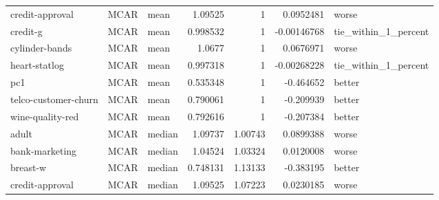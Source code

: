 \begin{table}[ht]
\begin{tabular}{lllrrrl}
 credit-approval      & MCAR        & mean             &                                 1.09525  &                             1        &                     0.0952481  & worse                \\
 credit-g             & MCAR        & mean             &                                 0.998532 &                             1        &                    -0.00146768 & tie\_within\_1\_percent \\
 cylinder-bands       & MCAR        & mean             &                                 1.0677   &                             1        &                     0.0676971  & worse                \\
 heart-statlog        & MCAR        & mean             &                                 0.997318 &                             1        &                    -0.00268228 & tie\_within\_1\_percent \\
 pc1                  & MCAR        & mean             &                                 0.535348 &                             1        &                    -0.464652   & better               \\
 telco-customer-churn & MCAR        & mean             &                                 0.790061 &                             1        &                    -0.209939   & better               \\
 wine-quality-red     & MCAR        & mean             &                                 0.792616 &                             1        &                    -0.207384   & better               \\
 adult                & MCAR        & median           &                                 1.09737  &                             1.00743  &                     0.0899388  & worse                \\
 bank-marketing       & MCAR        & median           &                                 1.04524  &                             1.03324  &                     0.0120008  & worse                \\
 breast-w             & MCAR        & median           &                                 0.748131 &                             1.13133  &                    -0.383195   & better               \\
 credit-approval      & MCAR        & median           &                                 1.09525  &                             1.07223  &                     0.0230185  & worse                \\

\end{tabular}
\end{table}
